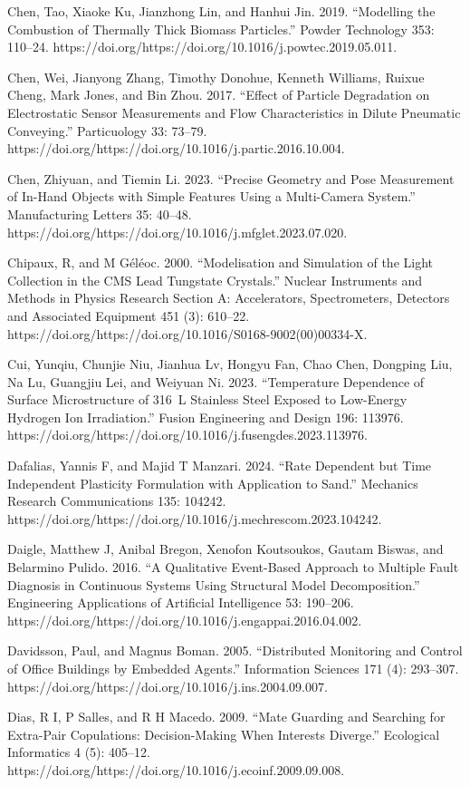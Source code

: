 \documentclass[utf8]{gradu3}
\begin{document}
Chen, Tao, Xiaoke Ku, Jianzhong Lin, and Hanhui Jin. 2019. “Modelling the Combustion of Thermally Thick Biomass Particles.” Powder Technology 353: 110–24. https://doi.org/https://doi.org/10.1016/j.powtec.2019.05.011.

Chen, Wei, Jianyong Zhang, Timothy Donohue, Kenneth Williams, Ruixue Cheng, Mark Jones, and Bin Zhou. 2017. “Effect of Particle Degradation on Electrostatic Sensor Measurements and Flow Characteristics in Dilute Pneumatic Conveying.” Particuology 33: 73–79. https://doi.org/https://doi.org/10.1016/j.partic.2016.10.004.

Chen, Zhiyuan, and Tiemin Li. 2023. “Precise Geometry and Pose Measurement of In-Hand Objects with Simple Features Using a Multi-Camera System.” Manufacturing Letters 35: 40–48. https://doi.org/https://doi.org/10.1016/j.mfglet.2023.07.020.

Chipaux, R, and M Géléoc. 2000. “Modelisation and Simulation of the Light Collection in the CMS Lead Tungstate Crystals.” Nuclear Instruments and Methods in Physics Research Section A: Accelerators, Spectrometers, Detectors and Associated Equipment 451 (3): 610–22. https://doi.org/https://doi.org/10.1016/S0168-9002(00)00334-X.

Cui, Yunqiu, Chunjie Niu, Jianhua Lv, Hongyu Fan, Chao Chen, Dongping Liu, Na Lu, Guangjiu Lei, and Weiyuan Ni. 2023. “Temperature Dependence of Surface Microstructure of 316 L Stainless Steel Exposed to Low-Energy Hydrogen Ion Irradiation.” Fusion Engineering and Design 196: 113976. https://doi.org/https://doi.org/10.1016/j.fusengdes.2023.113976.

Dafalias, Yannis F, and Majid T Manzari. 2024. “Rate Dependent but Time Independent Plasticity Formulation with Application to Sand.” Mechanics Research Communications 135: 104242. https://doi.org/https://doi.org/10.1016/j.mechrescom.2023.104242.

Daigle, Matthew J, Anibal Bregon, Xenofon Koutsoukos, Gautam Biswas, and Belarmino Pulido. 2016. “A Qualitative Event-Based Approach to Multiple Fault Diagnosis in Continuous Systems Using Structural Model Decomposition.” Engineering Applications of Artificial Intelligence 53: 190–206. https://doi.org/https://doi.org/10.1016/j.engappai.2016.04.002.

Davidsson, Paul, and Magnus Boman. 2005. “Distributed Monitoring and Control of Office Buildings by Embedded Agents.” Information Sciences 171 (4): 293–307. https://doi.org/https://doi.org/10.1016/j.ins.2004.09.007.

Dias, R I, P Salles, and R H Macedo. 2009. “Mate Guarding and Searching for Extra-Pair Copulations: Decision-Making When Interests Diverge.” Ecological Informatics 4 (5): 405–12. https://doi.org/https://doi.org/10.1016/j.ecoinf.2009.09.008.
\end{document}

